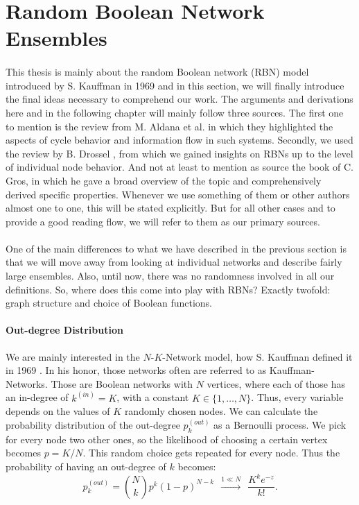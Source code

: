 \section{Random Boolean Network Ensembles}

\paragraph*{}
This thesis is mainly about the random Boolean network (RBN) model introduced by S. Kauffman in 1969 \cite{kauffman1969homeostasis} and in this section, we will finally introduce the final ideas necessary to comprehend our work. The arguments and derivations here and in the following chapter will mainly follow three sources. The first one to mention is the review from M. Aldana et al. \cite{aldana2003boolean} in which they highlighted the aspects of cycle behavior and information flow in such systems. Secondly, we used the review by B. Drossel \cite{drossel2008random}, from which we gained insights on RBNs up to the level of individual node behavior. And not at least to mention as source the book of C. Gros, in which he gave a broad overview of the topic and comprehensively derived specific properties. Whenever we use something of them or other authors almost one to one, this will be stated explicitly. But for all other cases and to provide a good reading flow, we will refer to them as our primary sources.

\paragraph*{}
One of the main differences to what we have described in the previous section is that we will move away from looking at individual networks and describe fairly large ensembles. Also, until now, there was no randomness involved in all our definitions. So, where does this come into play with RBNs? Exactly twofold: graph structure and choice of Boolean functions.

\paragraph*{Out-degree Distribution}
We are mainly interested in the $ N $-$ K $-Network model, how S. Kauffman defined it in 1969 \cite{kauffman1969metabolic}. In his honor, those networks often are referred to as Kauffman-Networks.  Those are Boolean networks with $ N $ vertices, where each of those has an in-degree of $ k^{(in)} = K $, with a constant $ K \in \{1,\dots,N\} $. Thus, every variable depends on the values of $ K $ randomly chosen nodes. We can calculate the probability distribution of the out-degree $ p_{k}^{(out)} $ as a Bernoulli process. We pick for every node two other ones, so the likelihood of choosing a certain vertex becomes $ p = K/N $. This random choice gets repeated for every node. Thus the probability of having an out-degree of $ k $ becomes:
\begin{equation}\label{eq:Poisson}
p_{k}^{(out)} = {N\choose k}p^k (1-p)^{N-k}\ \ \stackrel{1\ll N}{\longrightarrow}\ \ \frac{K^k e^{-z}}{k!}.
\end{equation}

